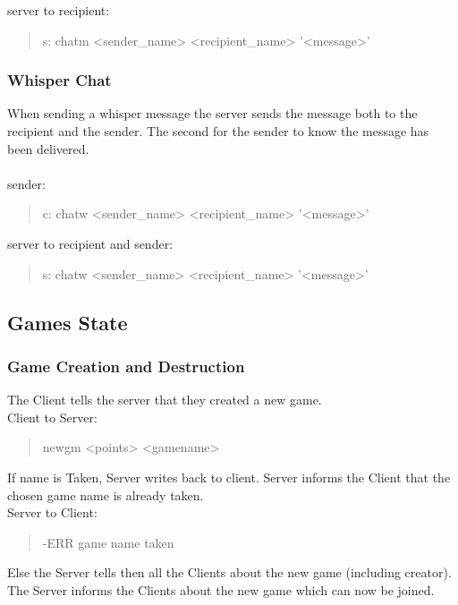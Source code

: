 \documentclass[a4paper,11pt]{article}
\begin{document}
\noindent
server to recipient:
\begin{quote}
  s: chatm <sender\_name> <recipient\_name> '<message>'\\ %
\end{quote}


\subsubsection{Whisper Chat}
When sending a whisper message the server sends the message both to the recipient and the sender. The second for the sender to know the message has been delivered.\\\\

\noindent
sender:
\begin{quote}
  c: chatw <sender\_name> <recipient\_name> '<message>'\\
\end{quote}

\noindent
server to recipient and sender:
\begin{quote}
  s: chatw <sender\_name> <recipient\_name> '<message>'\\
\end{quote}
\clearpage
\subsection{Games State}

\subsubsection{Game Creation and Destruction}
The Client tells the server that they created a new game.\\
Client to Server:
\begin{quote}
  newgm <points> <gamename>
\end{quote}

\noindent
If name is Taken, Server writes back to client. Server informs the Client that the chosen game name is already taken.\\
Server to Client:
\begin{quote}
  -ERR game name taken
\end{quote}

\noindent
Else the Server tells then all the Clients about the new game (including creator). The Server informs the Clients about the new game which can now be joined.\\\\
\end{document}

